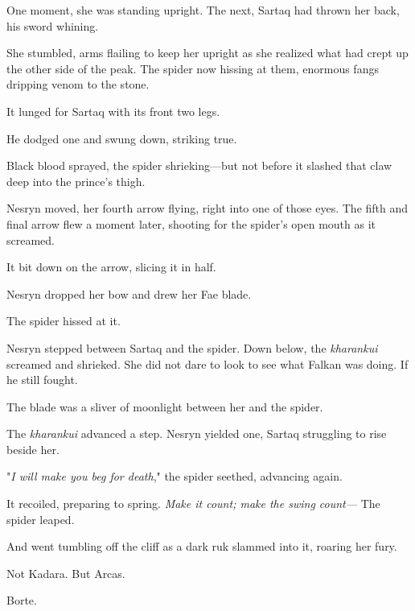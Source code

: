 One moment, she was standing upright. The next, Sartaq had thrown her back, his sword whining.

She stumbled, arms flailing to keep her upright as she realized what had crept up the other side of the peak. The spider now hissing at them, enormous fangs dripping venom to the stone.

It lunged for Sartaq with its front two legs.

He dodged one and swung down, striking true.

Black blood sprayed, the spider shrieking---but not before it slashed that claw deep into the prince's thigh.

Nesryn moved, her fourth arrow flying, right into one of those eyes. The fifth and final arrow flew a moment later, shooting for the spider's open mouth as it screamed.

It bit down on the arrow, slicing it in half.

Nesryn dropped her bow and drew her Fae blade.

The spider hissed at it.

Nesryn stepped between Sartaq and the spider. Down below, the
\emph{kharankui} screamed and shrieked. She did not dare to look to see what Falkan was doing. If he still fought.

The blade was a sliver of moonlight between her and the spider.

The \emph{kharankui} advanced a step. Nesryn yielded one, Sartaq struggling to rise beside her.

"\emph{I will make you beg for death}," the spider seethed, advancing again.

It recoiled, preparing to spring. \emph{Make it count; make the swing count---} The spider leaped.

And went tumbling off the cliff as a dark ruk slammed into it, roaring her fury.

Not Kadara. But Arcas.

Borte.

